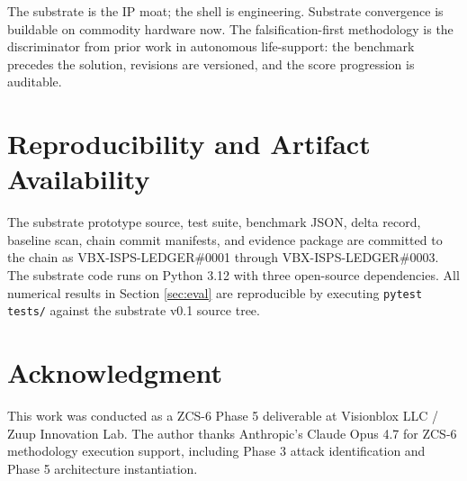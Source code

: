 \documentclass[conference]{IEEEtran}
\theoremstyle{definition}
\theoremstyle{plain}
\theoremstyle{remark}
\begin{document}
The substrate is the IP moat; the shell is engineering. Substrate convergence is buildable on commodity hardware now. The falsification-first methodology is the discriminator from prior work in autonomous life-support: the benchmark precedes the solution, revisions are versioned, and the score progression is auditable.

\section*{Reproducibility and Artifact Availability}

The substrate prototype source, test suite, benchmark JSON, delta record, baseline scan, chain commit manifests, and evidence package are committed to the chain as VBX-ISPS-LEDGER\#0001 through VBX-ISPS-LEDGER\#0003. The substrate code runs on Python 3.12 with three open-source dependencies. All numerical results in Section \ref{sec:eval} are reproducible by executing \texttt{pytest tests/} against the substrate v0.1 source tree.

\section*{Acknowledgment}

This work was conducted as a ZCS-6 Phase 5 deliverable at Visionblox LLC / Zuup Innovation Lab. The author thanks Anthropic's Claude Opus 4.7 for ZCS-6 methodology execution support, including Phase 3 attack identification and Phase 5 architecture instantiation.



\end{document}
